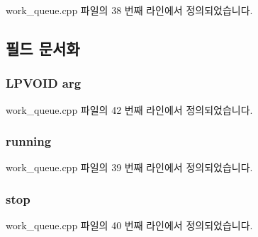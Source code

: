 work\+\_\+queue.\+cpp 파일의 38 번째 라인에서 정의되었습니다.



\subsection{필드 문서화}
\subsubsection[{\texorpdfstring{arg}{arg}}]{\setlength{\rightskip}{0pt plus 5cm}L\+P\+V\+O\+ID arg}\hypertarget{struct_w_w_queue_thread_state_ad688f8fe19987dce997535b44605a118}{}\label{struct_w_w_queue_thread_state_ad688f8fe19987dce997535b44605a118}


work\+\_\+queue.\+cpp 파일의 42 번째 라인에서 정의되었습니다.

\subsubsection[{\texorpdfstring{running}{running}}]{ running}\hypertarget{struct_w_w_queue_thread_state_a36f7b6be7108281af77939ceaec42fd6}{}\label{struct_w_w_queue_thread_state_a36f7b6be7108281af77939ceaec42fd6}


work\+\_\+queue.\+cpp 파일의 39 번째 라인에서 정의되었습니다.

\subsubsection[{\texorpdfstring{stop}{stop}}]{ stop}\hypertarget{struct_w_w_queue_thread_state_a53a2d16dac430353052f49aaa0cce34a}{}\label{struct_w_w_queue_thread_state_a53a2d16dac430353052f49aaa0cce34a}


work\+\_\+queue.\+cpp 파일의 40 번째 라인에서 정의되었습니다.

